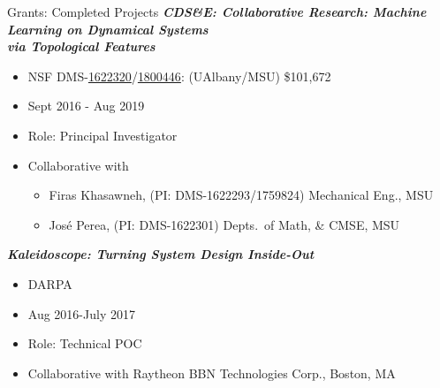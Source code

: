 \documentclass{resume} %
\begin{document}
\begin{rSection}{Grants: Completed Projects}
\textbf{\textit{CDS\&E: Collaborative Research: Machine Learning on Dynamical Systems\\ via Topological Features}}
\vspace{-.1in}
\begin{itemize}{}{\leftmargin=0em}
   \itemsep -0.6em %
   \item
NSF DMS-\href{https://nsf.gov/awardsearch/showAward?AWD_ID=1622320}{1622320}/\href{https://nsf.gov/awardsearch/showAward?AWD_ID=1800446}{1800446}: (UAlbany/MSU)  \$101,672
\item
Sept 2016 - Aug 2019
   \item
Role: Principal Investigator
\item Collaborative with
   \vspace{-.1in}
\begin{itemize}{}{\leftmargin=0em}
   \itemsep -0.6em %
   \item Firas Khasawneh, (PI: DMS-1622293/1759824) Mechanical Eng., MSU
   \item Jos\'e Perea, (PI: DMS-1622301) Depts.~of Math, \& CMSE, MSU
   \end{itemize}


\end{itemize}




\textbf{\textit{Kaleidoscope: Turning System Design Inside-Out}}
\vspace{-.1in}
\begin{itemize}{}{\leftmargin=0em}
   \itemsep -0.6em %
   \item
DARPA
\item
Aug 2016-July 2017
   \item
Role: Technical POC
\item Collaborative with
Raytheon BBN Technologies Corp., Boston, MA


\end{itemize}
\end{rSection}
\end{document}
